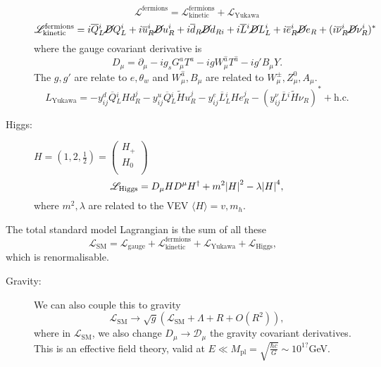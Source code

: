 \begin{description}
    \begin{equation}
      \mathscr{L}^{\text{fermions}} = \mathscr{L}^{\text{fermions}}_{\text{kinetic}} + \mathscr{L}_{\text{Yukawa}}
    \end{equation}  
    \begin{equation}
      \mathscr{L}_{\text{kinetic}}^{\text{fermions}} = i \overline{Q}{}_L^{i} \cancel{D} Q_L^{i} + i \overline{u}{}_R^{i} \cancel{D} u_R^{i} + i \overline{d}{}_R \cancel{D} d_{R i} + i \overline{L}{}^{i} \cancel{D} L_L^{i} + i \overline{e}{}_R^{i} \cancel{D} e_R + (i \overline{\nu}{}_R^{i} \cancel{D}\nu_R^{i})^*
    \end{equation}
    where the gauge covariant derivative is
    \begin{equation}
      D_{\mu} = \partial_{\mu} - i g_s G_{\mu}^{a} T^{a} - i g W_{\mu}^{\hat{a}} T^{\hat{a}} - i g' B_{\mu} Y.
    \end{equation}
    The $g, g'$ are relate to $e, \theta_w$ and $W_{\mu}^{\hat{a}}, B_{\mu}$ are related to $W_{\mu}^{\pm}, Z^0_{\mu}, A_{\mu}$.
    \begin{equation}
      L_{\text{Yukawa}} = - y^{d}_{ij} \overline{Q}{}^{i}_{L} H d_R^{j} - y^{u}_{ij} \overline{Q}{}^{i}_{L} \widetilde{H} u^{j}_{R} - y^{e}_{ij} \overline{L}{}^{i}_{L} H e^{j}_{R} - (y^{\nu}_{ij} \overline{L}{}^{i} \widetilde{H} \nu_{R})^* + \text{h.c.}
    \end{equation}
  \item[Higgs:] $H = (1, 2, \frac{1}{2}) = 
    \begin{pmatrix}
    H_+ \\
    H_0 \\
    \end{pmatrix} $
    \begin{equation}
      \mathscr{L}_{\text{Higgs}} = D_{\mu} H D^{\mu} H^{\dagger} + m^2 \abs{H}^2 - \lambda \abs{H}^4,
    \end{equation}
    where $m^2, \lambda$ are related to the VEV $\langle H \rangle = v, m_h$.
\end{description}
The total standard model Lagrangian is the sum of all these
\begin{equation}
  \mathscr{L}_{\text{SM}} = \mathscr{L}_{\text{gauge}} + \mathscr{L}_{\text{kinetic}}^{\text{fermions}} + \mathscr{L}_{\text{Yukawa}} + \mathscr{L}_{\text{Higgs}},
\end{equation}
which is renormalisable.
\begin{description}
  \item[Gravity:] We can also couple this to gravity
    \begin{equation}
      \mathscr{L}_{\text{SM}} \to \sqrt{g} \left( \mathscr{L}_{\text{SM}} + \Lambda + R + O(R^2) \right),
    \end{equation}
    where in $\mathscr{L}_{\text{SM}}$, we also change $D_{\mu} \to \mathcal{D}_{\mu}$ the gravity covariant derivatives.
    This is an effective field theory, valid at $E \ll M_{\text{pl}} = \sqrt{\frac{\hbar c}{G}} \sim 10^{1?}$GeV.
\end{description}

